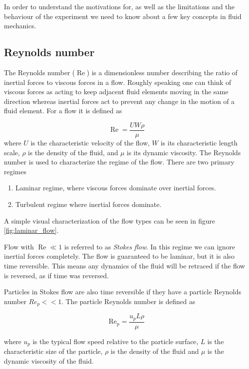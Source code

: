 \label{sec:fluid}
In order to understand the motivations for, as well as the limitations and the behaviour of the experiment we need to know about a few key concepts in fluid mechanics.

\subsection{Reynolds number}
The Reynolds number ($\operatorname{Re}$) is a dimensionless number describing the ratio of inertial forces to viscous forces in a flow. Roughly speaking one can think of viscous forces as acting to keep adjacent fluid elements moving in the same direction whereas inertial forces act to prevent any change in the motion of a fluid element. For a flow it is defined as \cite{introfluid}

\begin{equation}\label{eq:reynolds}
\operatorname{Re} = \frac{U W \rho}{\mu}
\end{equation}
where $U$ is the characteristic velocity of the flow, $W$ is its characteristic length scale, $\rho$ is the density of the fluid, and $\mu$ is its dynamic viscosity. The Reynolds number is used to characterize the regime of the flow. There are two primary regimes
\begin{enumerate}
\item Laminar regime, where viscous forces dominate over inertial forces.
\item Turbulent regime where inertial forces dominate.
\end{enumerate}

A simple visual characterization of the flow types can be seen in figure \ref{fig:laminar_flow}. 

Flow with $\operatorname{Re}\ll 1$ is referred to as \emph{Stokes flow}. In this regime we can ignore inertial forces completely. The flow is guaranteed to be laminar, but it is also time reversible. This means any dynamics of the fluid will be retraced if the flow is reversed, as if time was reversed. ~\cite{introfluid3}
 
Particles in Stokes flow are also time reversible if they have a particle Reynolds number $Re_p << 1$. The particle Reynolds number is defined as \cite{JonasLic}

\begin{equation}\label{eq:reynoldsparticle}
\operatorname{Re_p} = \frac{u_p L \rho}{\mu}
\end{equation}

where $u_p$ is the typical flow speed relative to the particle surface, $L$ is the characteristic size of the particle, $\rho$ is the density of the fluid and $\mu$ is the dynamic viscosity of the fluid. 

